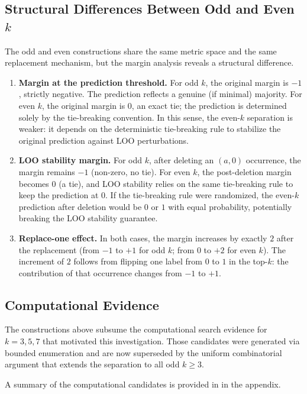 \subsection{Structural Differences Between Odd and Even $k$}

The odd and even constructions share the same metric space and the same
replacement mechanism, but the margin analysis reveals a structural difference.

\begin{enumerate}[leftmargin=*,label=(\arabic*)]

\item \textbf{Margin at the prediction threshold.}
For odd $k$, the original margin is $-1$, strictly negative. The prediction
reflects a genuine (if minimal) majority. For even $k$, the original margin is
$0$, an exact tie; the prediction is determined solely by the tie-breaking
convention. In this sense, the even-$k$ separation is weaker: it depends on the
deterministic tie-breaking rule to stabilize the original prediction against
LOO perturbations.

\item \textbf{LOO stability margin.}
For odd $k$, after deleting an $(a,0)$ occurrence, the margin remains $-1$
(non-zero, no tie). For even $k$, the post-deletion margin becomes $0$
(a tie), and LOO stability relies on the same tie-breaking rule to keep the
prediction at $0$. If the tie-breaking rule were randomized, the even-$k$
prediction after deletion would be $0$ or $1$ with equal probability,
potentially breaking the LOO stability guarantee.

\item \textbf{Replace-one effect.}
In both cases, the margin increases by exactly $2$ after the replacement
(from $-1$ to $+1$ for odd $k$; from $0$ to $+2$ for even $k$). The increment
of $2$ follows from flipping one label from $0$ to $1$ in the top-$k$: the
contribution of that occurrence changes from $-1$ to $+1$.

\end{enumerate}

\subsection{Computational Evidence}

The constructions above subsume the computational search evidence for
$k=3,5,7$ that motivated this investigation. Those candidates were generated
via bounded enumeration and are now superseded by the uniform combinatorial
argument that extends the separation to all odd $k \ge 3$.

A summary of the computational candidates is provided in
 in the appendix.
